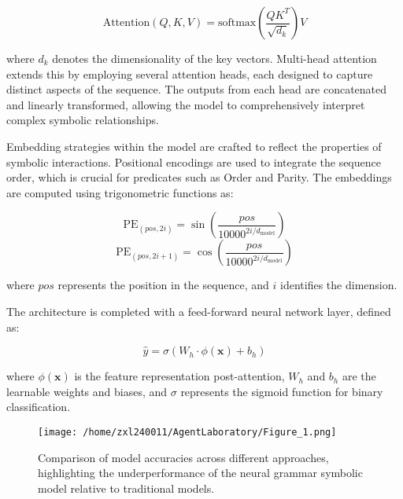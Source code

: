 \documentclass{article}
\begin{document}
\[
\text{Attention}(Q, K, V) = \text{softmax}\left(\frac{QK^T}{\sqrt{d_k}}\right)V
\]

where $d_k$ denotes the dimensionality of the key vectors. Multi-head attention extends this by employing several attention heads, each designed to capture distinct aspects of the sequence. The outputs from each head are concatenated and linearly transformed, allowing the model to comprehensively interpret complex symbolic relationships.

Embedding strategies within the model are crafted to reflect the properties of symbolic interactions. Positional encodings are used to integrate the sequence order, which is crucial for predicates such as Order and Parity. The embeddings are computed using trigonometric functions as:

\[
\text{PE}_{(pos, 2i)} = \sin\left(\frac{pos}{10000^{2i/d_{\text{model}}}}\right)
\]
\[
\text{PE}_{(pos, 2i+1)} = \cos\left(\frac{pos}{10000^{2i/d_{\text{model}}}}\right)
\]

where $pos$ represents the position in the sequence, and $i$ identifies the dimension.

The architecture is completed with a feed-forward neural network layer, defined as:

\[
\hat{y} = \sigma(W_h \cdot \phi(\mathbf{x}) + b_h)
\]

where $\phi(\mathbf{x})$ is the feature representation post-attention, $W_h$ and $b_h$ are the learnable weights and biases, and $\sigma$ represents the sigmoid function for binary classification.

\begin{figure}[h]
\caption{Comparison of model accuracies across different approaches, highlighting the underperformance of the neural grammar symbolic model relative to traditional models.}
\centering
\texttt{[image: /home/zxl240011/AgentLaboratory/Figure\_1.png]}
\label{fig:fig1}
\end{figure}
\end{document}
